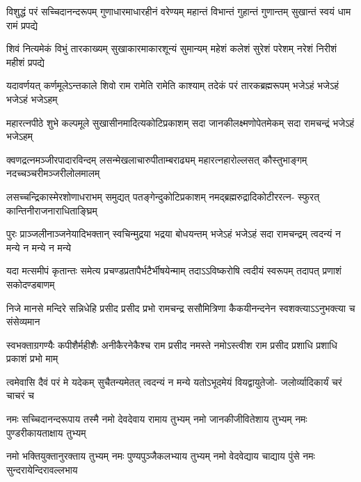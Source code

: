 

\fourlineindentedshloka
{विशुद्धं परं सच्चिदानन्दरूपम्}
{गुणाधारमाधारहीनं वरेण्यम्}
{महान्तं विभान्तं गुहान्तं गुणान्तम्}
{सुखान्तं स्वयं धाम रामं प्रपद्ये}%

\fourlineindentedshloka
{शिवं नित्यमेकं विभुं तारकाख्यम्}
{सुखाकारमाकारशून्यं सुमान्यम्}
{महेशं कलेशं सुरेशं परेशम्}
{नरेशं निरीशं महीशं प्रपद्ये}%

\fourlineindentedshloka
{यदावर्णयत् कर्णमूलेऽन्तकाले}
{शिवो राम रामेति रामेति काश्याम्}
{तदेकं परं तारकब्रह्मरूपम्}
{भजेऽहं भजेऽहं भजेऽहं भजेऽहम्}%

\fourlineindentedshloka
{महारत्नपीठे शुभे कल्पमूले}
{सुखासीनमादित्यकोटिप्रकाशम्}
{सदा जानकीलक्ष्मणोपेतमेकम्}
{सदा रामचन्द्रं भजेऽहं भजेऽहम्}%

\fourlineindentedshloka
{क्वणद्रत्नमञ्जीरपादारविन्दम्}
{लसन्मेखलाचारुपीताम्बराढ्यम्}
{महारत्नहारोल्लसत्‌ कौस्तुभाङ्गम्}
{नदच्चञ्चरीमञ्जरीलोलमालम्}%

\fourlineindentedshloka
{लसच्चन्द्रिकास्मेरशोणाधराभम्}
{समुद्यत् पतङ्गेन्दुकोटिप्रकाशम्}
{नमद्‌ब्रह्मरुद्रादिकोटीररत्न-}
{स्फुरत् कान्तिनीराजनाराधिताङ्घ्रिम्}%

\fourlineindentedshloka
{पुरः प्राञ्जलीनाञ्जनेयादिभक्तान्‌}
{स्वचिन्मुद्रया भद्रया बोधयन्तम्‌}
{भजेऽहं भजेऽहं सदा रामचन्द्रम्}
{त्वदन्यं न मन्ये न मन्ये न मन्ये}%

\fourlineindentedshloka
{यदा मत्समीपं कृतान्तः समेत्य}
{प्रचण्डप्रतापैर्भटैर्भीषयेन्माम्}
{तदाऽऽविष्करोषि त्वदीयं स्वरूपम्}
{तदापत् प्रणाशं सकोदण्डबाणम्}%

\fourlineindentedshloka
{निजे मानसे मन्दिरे सन्निधेहि}
{प्रसीद प्रसीद प्रभो रामचन्द्र}
{ससौमित्रिणा कैकयीनन्दनेन}
{स्वशक्त्याऽऽनुभक्त्या च संसेव्यमान}%

\fourlineindentedshloka
{स्वभक्ताग्रगण्यैः कपीशैर्महीशैः}
{अनीकैरनेकैश्च राम प्रसीद}
{नमस्ते नमोऽस्त्वीश राम प्रसीद}
{प्रशाधि प्रशाधि प्रकाशं प्रभो माम्}%

\fourlineindentedshloka
{त्वमेवासि दैवं परं मे यदेकम्}
{सुचैतन्यमेतत् त्वदन्यं न मन्ये}
{यतोऽभूदमेयं वियद्वायुतेजो-}
{जलोर्व्यादिकार्यं चरं चाचरं च}%

\fourlineindentedshloka
{नमः सच्चिदानन्दरूपाय तस्मै}
{नमो देवदेवाय रामाय तुभ्यम्}
{नमो जानकीजीवितेशाय तुभ्यम्}
{नमः पुण्डरीकायताक्षाय तुभ्यम्}%

\fourlineindentedshloka
{नमो भक्तियुक्तानुरक्ताय तुभ्यम्}
{नमः पुण्यपुञ्जैकलभ्याय तुभ्यम्}
{नमो वेदवेद्याय चाद्याय पुंसे}
{नमः सुन्दरायेन्दिरावल्लभाय}%

